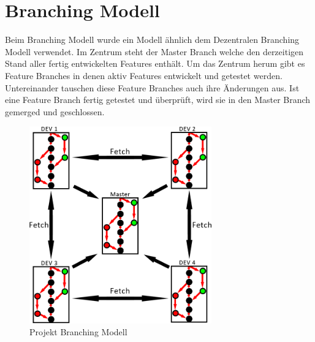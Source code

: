 \chapter{Branching Modell}

Beim Branching Modell wurde ein Modell ähnlich dem Dezentralen Branching Modell verwendet. Im Zentrum steht der Master Branch welche den derzeitigen Stand aller fertig entwickelten Features enthält. Um das Zentrum herum gibt es Feature Branches in denen aktiv Features entwickelt und getestet werden. Untereinander tauschen diese Feature Branches auch ihre Änderungen aus. Ist eine Feature Branch fertig getestet und überprüft, wird sie in den Master Branch gemerged und geschlossen.

\begin{figure}[H]
	\centering
	\includegraphics[width=0.7\textwidth]{branch/center_repo.png}
	\caption{Projekt Branching Modell}
	\label{figure:diagram_branching_model}
\end{figure}